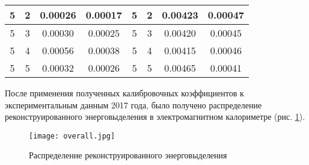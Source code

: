 \begin{table}[H]
\begin{tabular}{|c|c|c|c|c|c|c|c|}
5                                      & 2                                      & 0.00026                                                             & 0.00017                                                                 & 5                                      & 2                                     & 0.00423                                                             & 0.00047                                                                 \\ \hline
5                                      & 3                                      & 0.00030                                                             & 0.00025                                                                 & 5                                      & 3                                     & 0.00420                                                             & 0.00045                                                                 \\ \hline
5                                      & 4                                      & 0.00056                                                             & 0.00038                                                                 & 5                                      & 4                                     & 0.00415                                                             & 0.00046                                                                 \\ \hline
5                                      & 5                                      & 0.00032                                                             & 0.00026                                                                 & 5                                      & 5                                     & 0.00465                                                             & 0.00041                                                                 \\ \hline
\end{tabular}%
\end{table}

После применения полученных калибровочных коэффициентов к экспериментальным данным 2017 года, было получено распределение реконструированного энерговыделения в электромагнитном калориметре (рис. \ref{fig:overall}).

\begin{figure}[H]
    \centering
    \texttt{[image: overall.jpg]}
    \caption{Распределение реконструированного энерговыделения}
    \label{fig:overall}
\end{figure}

